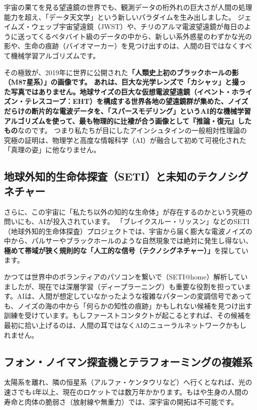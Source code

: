 宇宙の果てを見る望遠鏡の世界でも、観測データの桁外れの巨大さが人間の処理能力を超え、「データ天文学」という新しいパラダイムを生み出しました。 ジェイムズ・ウェッブ宇宙望遠鏡（JWST）や、チリのアルマ電波望遠鏡が毎日のように送ってくるペタバイト級のデータの中から、新しい系外惑星のわずかな光の影や、生命の痕跡（バイオマーカー）を見つけ出すのは、人間の目ではなくすべて機械学習アルゴリズムです。

その極致が、2019年に世界に公開された\textbf{「人類史上初のブラックホールの影（M87星系）」の画像です。 あれは、巨大な光学レンズで「カシャッ」と撮った写真ではありません。地球サイズの巨大な仮想電波望遠鏡（イベント・ホライズン・テレスコープ：EHT）を構成する世界各地の望遠鏡群が集めた、ノイズだらけの断片的な電波データを、「スパースモデリング」というAI的な機械学習アルゴリズムを使って、最も物理的に辻褄が合う画像として『推論・復元』したもの}なのです。 つまり私たちが目にしたアインシュタインの一般相対性理論の究極の証明は、物理学と高度な情報科学（AI）が融合して初めて可視化された「真理の姿」に他なりません。

\subsection{地球外知的生命体探査（SETI）と未知のテクノシグネチャー}

さらに、この宇宙に「私たち以外の知的な生命体」が存在するのかという究極の問いにも、AIが投入されています。 「ブレイクスルー・リッスン」などのSETI（地球外知的生命体探査）プロジェクトでは、宇宙から届く膨大な電波ノイズの中から、パルサーやブラックホールのような自然現象では絶対に発生し得ない、\textbf{極めて帯域が狭く規則的な「人工的な信号（テクノシグネチャー）」}を探しています。

かつては世界中のボランティアのパソコンを繋いで（SETI@home）解析していましたが、現在では深層学習（ディープラーニング）も重要な役割を担っています。AIは、人間が想定していなかったような複雑なパターンの変調信号であっても、ノイズの海の中から「何らかの知性の痕跡」かもしれない候補を見つけ出す訓練を受けています。もしファーストコンタクトが起こるとすれば、その候補を最初に拾い上げるのは、人間の耳ではなくAIのニューラルネットワークかもしれません。

\subsection{フォン・ノイマン探査機とテラフォーミングの複雑系}

太陽系を離れ、隣の恒星系（アルファ・ケンタウリなど）へ行くとなれば、光の速さでも4年以上、現在のロケットでは数万年かかります。もはや生身の人間の寿命と肉体の脆弱さ（放射線や無重力）では、深宇宙の開拓は不可能です。

